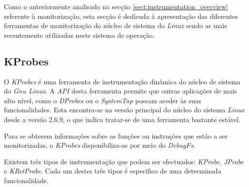 Como o anteriormente analisado na secção \ref{sect:instrumentation_overview} referente à monitorização, esta secção é dedicada à apresentação das diferentes ferramentas de monitorização do núcleo de sistema do \textit{Linux} sendo as mais recentemente utilizadas neste sistema de operação.

\subsection{KProbes}\label{sect:KProbes_overview}

O \textit{KProbes} é uma ferramenta de instrumentação dinâmica do núcleo de sistema do \textit{Gnu Linux}.
A \textit{API} desta ferramenta permite que outras aplicações de mais alto nível, como o \textit{DProbes} ou o \textit{SystemTap} possam aceder às suas funcionalidades.
Esta encontra-se na versão principal do núcleo do sistema \textit{Linux} desde a versão 2.6.9, o que indica tratar-se de uma ferramenta bastante estável\cite{kernel_debug_printk_on_fly,KProbesSite}.


Para se obterem informações sobre as funções ou instruções que estão a ser monitorizadas, o \textit{KProbes} disponibiliza-as por meio do \textit{DebugFs}.

Existem três tipos de instrumentação que podem ser efectuados: \textit{KProbe}, \textit{JProbe} e \textit{KRetProbe}.
Cada um destes três tipos é especifico de uma determinada funcionalidade.

